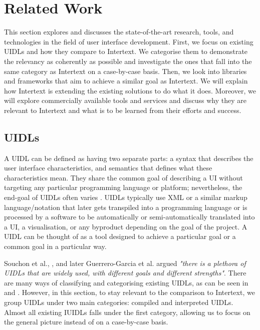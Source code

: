 
\chapter{Related Work} \label{relatedWork}

This section explores and discusses the state-of-the-art research, tools, and technologies in the field of user interface development. First, we focus on existing UIDLs and how they compare to Intertext. We categorise them to demonstrate the relevancy as coherently as possible and investigate the ones that fall into the same category as Intertext on a case-by-case basis. Then, we look into libraries and frameworks that aim to achieve a similar goal as Intertext. We will explain how Intertext is extending the existing solutions to do what it does. Moreover, we will explore commercially available tools and services and discuss why they are relevant to Intertext and what is to be learned from their efforts and success.

\section{UIDLs} \label{relatedUIDLs}

A UIDL can be defined as having two separate parts: a syntax that describes the user interface characteristics, and semantics that defines what these characteristics mean. They share the common goal of describing a UI without targeting any particular programming language or platform; nevertheless, the end-goal of UIDLs often varies \cite{XMLCompliantUIDLs}. UIDLs typically use XML or a similar markup language/notation that later gets transpiled into a programming language or is processed by a software to be automatically or semi-automatically translated into a UI, a visualisation, or any byproduct depending on the goal of the project. A UIDL can be thought of as a tool designed to achieve a particular goal or a common goal in a particular way. 

Souchon et al., \cite{XMLCompliantUIDLs}, and later Guerrero-Garcia et al. \cite{UIDLTheoreticalSurvey} argued \textit{"there is a plethora of UIDLs that are widely used, with different goals and different strengths"}. There are many ways of classifying and categorising existing UIDLs, as can be seen in \cite{XMLCompliantUIDLs} and \cite{UIDLTheoreticalSurvey}. However, in this section, to stay relevant to the comparison to Intertext, we group UIDLs under two main categories: compiled and interpreted UIDLs. Almost all existing IUIDLs falls under the first category, allowing us to focus on the general picture instead of on a case-by-case basis.

